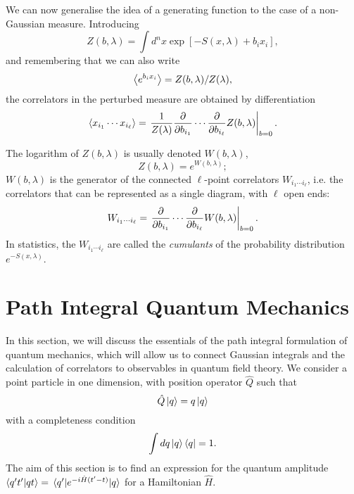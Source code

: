 \documentclass{article}
\numberwithin{equation}{section}
\begin{document}
We can now generalise the idea of a generating function to the case of a non-Gaussian measure. Introducing 
\begin{equation}
    Z(b, \lambda) = \int d^nx \exp[-S(x,\lambda) + b_i x_i],
\end{equation}
and remembering that we can also write
\begin{equation}
    \ev{e^{b_i x_i}} = Z(b, \lambda)/Z(\lambda),
\end{equation}
the correlators in the perturbed measure are obtained by differentiation
\begin{equation}
    \ev{x_{i_1} \cdots x_{i_\ell}} = \eval{\frac{1}{Z(\lambda)} \pdv{b_{i_1}} \cdots \pdv{b_{i_\ell}} Z(b, \lambda)}_{b=0}.
\end{equation}

The logarithm of $Z(b, \lambda)$ is usually denoted $W(b, \lambda)$,
\begin{equation}
    Z(b, \lambda) = e^{W(b,\lambda)};
\end{equation}
$W(b, \lambda)$ is the generator of the connected $\ell$-point correlators $W_{i_1 \cdots i_\ell}$, i.e. the correlators that can be represented as a single diagram, with $\ell$ open ends:
\begin{equation}
    W_{i_1 \cdots i_\ell} = \eval{\pdv{b_{i_1}} \cdots \pdv{b_{i_\ell}} W(b, \lambda)}_{b=0}.
\end{equation}
In statistics, the $W_{i_1 \cdots i_\ell}$ are called the \textit{cumulants} of the probability distribution $e^{-S(x, \lambda)}$.

\section{Path Integral Quantum Mechanics}

In this section, we will discuss the essentials of the path integral formulation of quantum mechanics, which will allow us to connect Gaussian integrals and the calculation of correlators to observables in quantum field theory. We consider a point particle in one dimension, with position operator $\hat{Q}$ such that
\begin{equation}
    \hat{Q}\ket{q} = q\ket{q}
\end{equation}
with a completeness condition
\begin{equation}
    \int dq \ket{q} \bra{q} = 1.
\end{equation}
The aim of this section is to find an expression for the quantum amplitude $\braket{q't'}{qt} = \mel{q'}{e^{-i\hat{H}(t'-t)}}{q}$ for a Hamiltonian $\hat{H}$.
\end{document}
